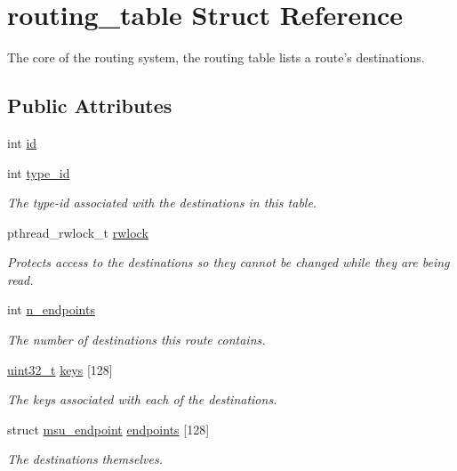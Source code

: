 \hypertarget{structrouting__table}{\section{routing\-\_\-table Struct Reference}
\label{structrouting__table}
}


The core of the routing system, the routing table lists a route's destinations.  


\subsection*{Public Attributes}
\begin{DoxyCompactItemize}
\item 
int \hyperlink{structrouting__table_a162359f4da0f31c95df59e2b51670d83}{id}
\item 
int \hyperlink{structrouting__table_a439ad2d1ec8a9d942bc3db95b02ea1a0}{type\-\_\-id}
\begin{DoxyCompactList}\small\item\em The type-\/id associated with the destinations in this table. \end{DoxyCompactList}\item 
pthread\-\_\-rwlock\-\_\-t \hyperlink{structrouting__table_acbdb86bbcf769654f18ad6b2bb6c61c4}{rwlock}
\begin{DoxyCompactList}\small\item\em Protects access to the destinations so they cannot be changed while they are being read. \end{DoxyCompactList}\item 
int \hyperlink{structrouting__table_a7d9a6d626a79a44bb58533c97ac9e7ce}{n\-\_\-endpoints}
\begin{DoxyCompactList}\small\item\em The number of destinations this route contains. \end{DoxyCompactList}\item 
\hyperlink{msus_2webserver_2uthash_8h_a435d1572bf3f880d55459d9805097f62}{uint32\-\_\-t} \hyperlink{structrouting__table_a488c5e77937df1e40c4b918093e50793}{keys} \mbox{[}128\mbox{]}
\begin{DoxyCompactList}\small\item\em The keys associated with each of the destinations. \end{DoxyCompactList}\item 
struct \hyperlink{structmsu__endpoint}{msu\-\_\-endpoint} \hyperlink{structrouting__table_a14e060336471c2720efcb502bdf0bce7}{endpoints} \mbox{[}128\mbox{]}
\begin{DoxyCompactList}\small\item\em The destinations themselves. \end{DoxyCompactList}\end{DoxyCompactItemize}



